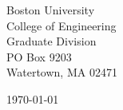 \begin{minipage}{0.49\textwidth}
\begin{flushleft}
\noindent
Boston University\\
College of Engineering\\
Graduate Division\\
PO Box 9203\\
Watertown, MA 02471\\

\end{flushleft}
\end{minipage}
\begin{minipage}{0.47\textwidth}
\begin{flushright}
\today
\end{flushright}
\end{minipage} \\

\newcommand{\univ}{Boston University}
\newcommand{\univshort}{BU}
\newcommand{\degree}{Ph.D.}
\newcommand{\dept}{Computer Science and Engineering}



